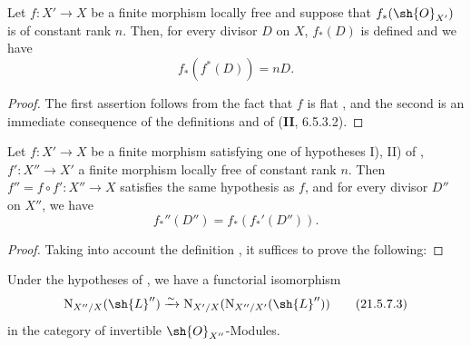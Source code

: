 \begin{proposition}[21.5.6]
\label{IV.21.5.6}
Let $f:X'\to X$ be a finite morphism locally free and suppose that $f_*(\sh{O}_{X'})$ is of constant rank $n$.
Then, for every divisor $D$ on $X$, $f_*(D)$ is defined and we have
\[
\label{IV.21.5.6.1}
  f_*(f^*(D))=nD.
  \tag{21.5.6.1}
\]
\end{proposition}

\begin{proof}
The first assertion follows from the fact that $f$ is flat , and the second is an immediate consequence of the definitions and of (\textbf{II}, 6.5.3.2).
\end{proof}

\begin{proposition}[21.5.7]
\label{IV.21.5.7}
Let $f:X'\to X$ be a finite morphism satisfying one of hypotheses I), II) of , $f':X''\to X'$ a finite morphism locally free of constant rank $n$.
Then $f''=f\circ f':X''\to X$ satisfies the same hypothesis as $f$, and for every divisor $D''$ on $X''$, we have
\[
\label{IV.21.5.7.1}
  f_*''(D'')=f_*(f_*'(D'')).
  \tag{21.5.7.1}
\]
\end{proposition}

\begin{proof}
Taking into account the definition , it suffices to prove the following:
\end{proof}

\begin{lemma}[21.5.7.2]
\label{IV.21.5.7.2}
Under the hypotheses of , we have a functorial isomorphism
\[
\label{IV.21.5.7.3}
  \mathrm{N}_{X''/X}(\sh{L}'')\xrightarrow{\sim}\mathrm{N}_{X'/X}(\mathrm{N}_{X''/X'}(\sh{L}''))
  \tag{21.5.7.3}
\]
in the category of invertible $\sh{O}_{X''}$-Modules.
\end{lemma}

